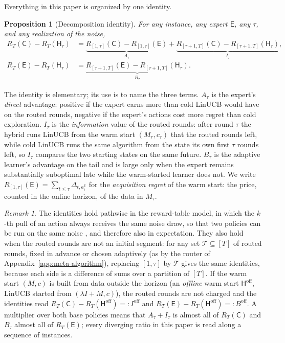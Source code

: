 \documentclass{article}
\newtheorem{proposition}{Proposition}
\theoremstyle{definition}
\theoremstyle{remark}
\newtheorem{remark}{Remark}
\theoremstyle{remark}
\newcommand{\Cold}{\mathsf{C}}
\newcommand{\Exp}{\mathsf{E}}
\newcommand{\Hyb}{\mathsf{H}}
\begin{document}
Everything in this paper is organized by one identity.

\begin{proposition}[Decomposition identity]
\label{prop:decomp}
For any instance, any expert $\Exp$, any $\tau$, and any realization of the
noise,
\begin{align*}
R_T(\Cold)-R_T(\Hyb_\tau)
&=\underbrace{R_{[1,\tau]}(\Cold)-R_{[1,\tau]}(\Exp)}_{A_\tau}
 +\underbrace{R_{[\tau+1,T]}(\Cold)-R_{[\tau+1,T]}(\Hyb_\tau)}_{I_\tau},\\
R_T(\Exp)-R_T(\Hyb_\tau)
&=\underbrace{R_{[\tau+1,T]}(\Exp)-R_{[\tau+1,T]}(\Hyb_\tau)}_{B_\tau}.
\end{align*}
\end{proposition}

The identity is elementary; its use is to name the three terms.
$A_\tau$ is the expert's \emph{direct} advantage: positive if the expert earns
more than cold LinUCB would have on the routed rounds, negative if the expert's
actions cost more regret than cold exploration. $I_\tau$ is the
\emph{information} value of the routed rounds: after round $\tau$ the hybrid
runs LinUCB from the warm start $(M_\tau,c_\tau)$ that the routed rounds left,
while cold LinUCB runs the same algorithm from the state its own first $\tau$
rounds left, so $I_\tau$ compares the two starting states on the same
future. $B_\tau$ is the adaptive learner's advantage on the tail and is large
only when the expert remains substantially suboptimal late while the
warm-started learner does not. We write $R_{[1,\tau]}(\Exp)=\sum_{t\le\tau}\Delta_{t,a_t^{\Exp}}$
for the \emph{acquisition regret} of the warm start: the price, counted in the
online horizon, of the data in $M_\tau$.

\begin{remark}
\label{rem:decomp}
The identities hold pathwise in the reward-table model, in which the $k$-th
pull of an action always receives the same noise draw, so that two policies
can be run on the same noise \cite[\S4.6]{lattimore2020bandit}, and
therefore also in expectation. They also hold when the routed rounds are not
an initial segment: for any set $\mathcal T\subseteq[T]$ of routed rounds,
fixed in advance or chosen adaptively (as by the router of
Appendix~\ref{app:meta-algorithm}), replacing $[1,\tau]$ by $\mathcal T$
gives the same identities, because each side is a difference of sums over a
partition of $[T]$. If the warm start $(M,c)$ is built from data outside the
horizon (an \emph{offline} warm start $\Hyb^{\mathrm{off}}$, LinUCB started
from $(\lambda I+M,c)$), the routed rounds are not charged and the identities
read $R_T(\Cold)-R_T(\Hyb^{\mathrm{off}})=:I^{\mathrm{off}}$ and
$R_T(\Exp)-R_T(\Hyb^{\mathrm{off}})=:B^{\mathrm{off}}$. A multiplier over both
base policies means that $A_\tau+I_\tau$ is almost all of $R_T(\Cold)$ and
$B_\tau$ almost all of $R_T(\Exp)$; every diverging ratio in this paper is
read along a sequence of instances.
\end{remark}
\end{document}
